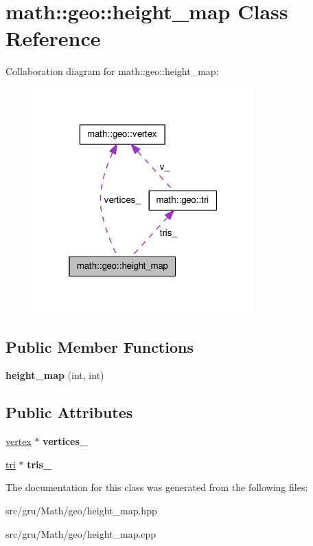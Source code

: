 \hypertarget{classmath_1_1geo_1_1height__map}{\section{math\-:\-:geo\-:\-:height\-\_\-map \-Class \-Reference}
\label{classmath_1_1geo_1_1height__map}
}


\-Collaboration diagram for math\-:\-:geo\-:\-:height\-\_\-map\-:\nopagebreak
\begin{figure}[H]
\begin{center}
\leavevmode
\includegraphics[width=241pt]{classmath_1_1geo_1_1height__map__coll__graph}
\end{center}
\end{figure}
\subsection*{\-Public \-Member \-Functions}
\begin{DoxyCompactItemize}
\item 
\hypertarget{classmath_1_1geo_1_1height__map_a56685f77f9750167f419366039118113}{{\bfseries height\-\_\-map} (int, int)}\label{classmath_1_1geo_1_1height__map_a56685f77f9750167f419366039118113}

\end{DoxyCompactItemize}
\subsection*{\-Public \-Attributes}
\begin{DoxyCompactItemize}
\item 
\hypertarget{classmath_1_1geo_1_1height__map_add2b5f09f8bf6a3d7c674afd0fcb0ee4}{\hyperlink{classmath_1_1geo_1_1vertex}{vertex} $\ast$ {\bfseries vertices\-\_\-}}\label{classmath_1_1geo_1_1height__map_add2b5f09f8bf6a3d7c674afd0fcb0ee4}

\item 
\hypertarget{classmath_1_1geo_1_1height__map_a29abf1041ebd17777d88a2b55ef82535}{\hyperlink{classmath_1_1geo_1_1tri}{tri} $\ast$ {\bfseries tris\-\_\-}}\label{classmath_1_1geo_1_1height__map_a29abf1041ebd17777d88a2b55ef82535}

\end{DoxyCompactItemize}


\-The documentation for this class was generated from the following files\-:\begin{DoxyCompactItemize}
\item 
src/gru/\-Math/geo/height\-\_\-map.\-hpp\item 
src/gru/\-Math/geo/height\-\_\-map.\-cpp\end{DoxyCompactItemize}
